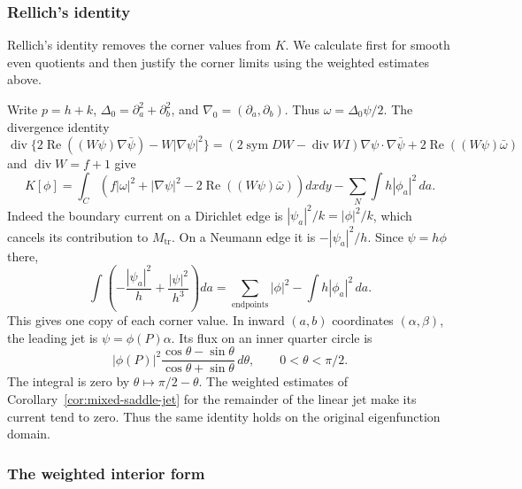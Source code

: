 \documentclass[reqno,11pt]{amsart}
\numberwithin{equation}{section}
\theoremstyle{remark}
\begin{document}
\subsubsection{Rellich's identity}

Rellich's identity removes the corner values from $K$. We calculate
first for smooth even quotients and then justify the corner limits
using the weighted estimates above.

Write $p=h+k$, $\Delta_0=\partial_a^2+\partial_b^2$, and
$\nabla_0=(\partial_a,\partial_b)$.  Thus
$\omega=\Delta_0\psi/2$.
The divergence identity
\[
 \operatorname{div}\{2\operatorname{Re}((W\psi)\nabla\bar\psi)
                              -W|\nabla\psi|^2\}
 =(2\operatorname{sym}DW-\operatorname{div}W I)
       \nabla\psi\cdot\nabla\bar\psi
       +2\operatorname{Re}((W\psi)\bar\omega)
\]
and $\operatorname{div}W=f+1$ give
\begin{equation}\label{eq:mixed-static-rellich}
 K[\phi]=\int_C\left(f|\omega|^2+|\nabla\psi|^2
                   -2\operatorname{Re}((W\psi)\bar\omega)\right)dxdy
              -\sum_N\int h|\phi_a|^2\,da.
\end{equation}
Indeed the boundary current on a Dirichlet edge is
$|\psi_a|^2/k=|\phi|^2/k$, which cancels its contribution to
$M_{\mathrm{tr}}$.  On a Neumann edge it is $-|\psi_a|^2/h$.
Since $\psi=h\phi$ there,
\[
 \int\left(-\frac{|\psi_a|^2}{h}
                        +\frac{|\psi|^2}{h^3}\right)da
 =\sum_{\text{endpoints}}|\phi|^2-\int h|\phi_a|^2\,da.
\]
This gives one copy of each corner value. In inward
$(a,b)$ coordinates $(\alpha,\beta)$, the leading jet is
$\psi=\phi(P)\alpha$.  Its flux on an inner quarter circle is
\[
 |\phi(P)|^2\frac{\cos\theta-\sin\theta}
                      {\cos\theta+\sin\theta}\,d\theta,
 \qquad 0<\theta<\pi/2.
\]
The integral is zero by $\theta\mapsto\pi/2-\theta$.
The weighted estimates of Corollary~\ref{cor:mixed-saddle-jet}
for the remainder of the linear jet make its current tend to zero.  Thus the same identity holds on
the original eigenfunction domain.



\subsubsection{The weighted interior form}
\end{document}

